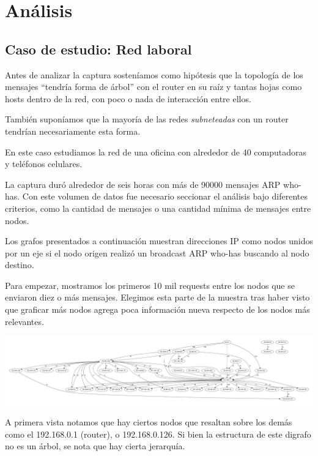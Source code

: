 \section{Análisis}

\subsection{Caso de estudio: Red laboral}

Antes de analizar la captura sosteníamos como hipótesis que la topología de los mensajes ``tendría forma de árbol'' con el router en su raíz y tantas hojas como hosts dentro de la red, con poco o nada de interacción entre ellos.\newline

También suponíamos que la mayoría de las redes \textit{subneteadas} con un router tendrían necesariamente esta forma.\newline

En este caso estudiamos la red de una oficina con alrededor de 40 computadoras y teléfonos celulares.\newline

La captura duró alrededor de seis horas con más de 90000 mensajes ARP who-has. Con este volumen de datos fue necesario seccionar el análisis bajo diferentes criterios, como la cantidad de mensajes o una cantidad mínima de mensajes entre nodos.\newline

Los grafos presentados a continuación muestran direcciones IP como nodos unidos por un eje si el nodo origen realizó un broadcast ARP who-has buscando al nodo destino.\newline

Para empezar, mostramos los primeros 10 mil requests entre los nodos que se enviaron diez o más mensajes. Elegimos esta parte de la muestra tras haber visto que graficar más nodos agrega poca información nueva respecto de los nodos más relevantes.\newline

\includegraphics[scale=0.25,angle=90]{graphics/t-work-10000c-10w.png}

A primera vista notamos que hay ciertos nodos que resaltan sobre los demás como el 192.168.0.1 (router), o 192.168.0.126. Si bien la estructura de este digrafo no es un árbol, se nota que hay cierta jerarquía.\newline

